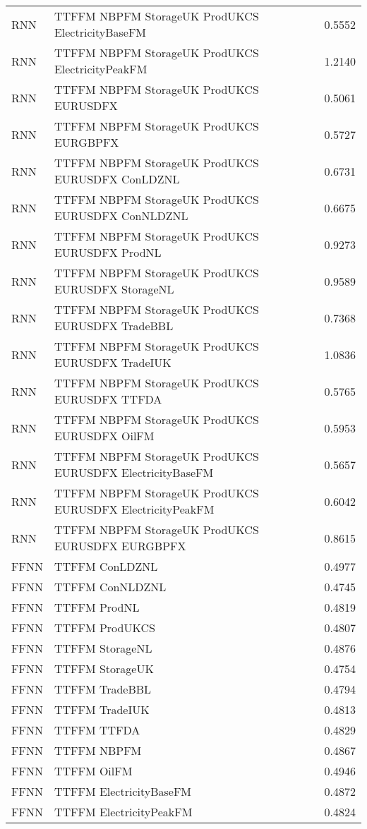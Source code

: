 \begin{table}[h!]
\begin{adjustbox}{max width=\textwidth}
\begin{tabular}{llr}
  RNN & TTFFM NBPFM StorageUK ProdUKCS ElectricityBaseFM & 0.5552 \\ 
  RNN & TTFFM NBPFM StorageUK ProdUKCS ElectricityPeakFM & 1.2140 \\ 
  RNN & TTFFM NBPFM StorageUK ProdUKCS EURUSDFX & 0.5061 \\ 
  RNN & TTFFM NBPFM StorageUK ProdUKCS EURGBPFX & 0.5727 \\ 
  RNN & TTFFM NBPFM StorageUK ProdUKCS EURUSDFX ConLDZNL & 0.6731 \\ 
  RNN & TTFFM NBPFM StorageUK ProdUKCS EURUSDFX ConNLDZNL & 0.6675 \\ 
  RNN & TTFFM NBPFM StorageUK ProdUKCS EURUSDFX ProdNL & 0.9273 \\ 
  RNN & TTFFM NBPFM StorageUK ProdUKCS EURUSDFX StorageNL & 0.9589 \\ 
  RNN & TTFFM NBPFM StorageUK ProdUKCS EURUSDFX TradeBBL & 0.7368 \\ 
  RNN & TTFFM NBPFM StorageUK ProdUKCS EURUSDFX TradeIUK & 1.0836 \\ 
  RNN & TTFFM NBPFM StorageUK ProdUKCS EURUSDFX TTFDA & 0.5765 \\ 
  RNN & TTFFM NBPFM StorageUK ProdUKCS EURUSDFX OilFM & 0.5953 \\ 
  RNN & TTFFM NBPFM StorageUK ProdUKCS EURUSDFX ElectricityBaseFM & 0.5657 \\ 
  RNN & TTFFM NBPFM StorageUK ProdUKCS EURUSDFX ElectricityPeakFM & 0.6042 \\ 
  RNN & TTFFM NBPFM StorageUK ProdUKCS EURUSDFX EURGBPFX & 0.8615 \\ 
  FFNN & TTFFM ConLDZNL & 0.4977 \\ 
  FFNN & TTFFM ConNLDZNL & 0.4745 \\ 
  FFNN & TTFFM ProdNL & 0.4819 \\ 
  FFNN & TTFFM ProdUKCS & 0.4807 \\ 
  FFNN & TTFFM StorageNL & 0.4876 \\ 
  FFNN & TTFFM StorageUK & 0.4754 \\ 
  FFNN & TTFFM TradeBBL & 0.4794 \\ 
  FFNN & TTFFM TradeIUK & 0.4813 \\ 
  FFNN & TTFFM TTFDA & 0.4829 \\ 
  FFNN & TTFFM NBPFM & 0.4867 \\ 
  FFNN & TTFFM OilFM & 0.4946 \\ 
  FFNN & TTFFM ElectricityBaseFM & 0.4872 \\ 
  FFNN & TTFFM ElectricityPeakFM & 0.4824 \\ 

\end{tabular}
\end{adjustbox}
\end{table}
